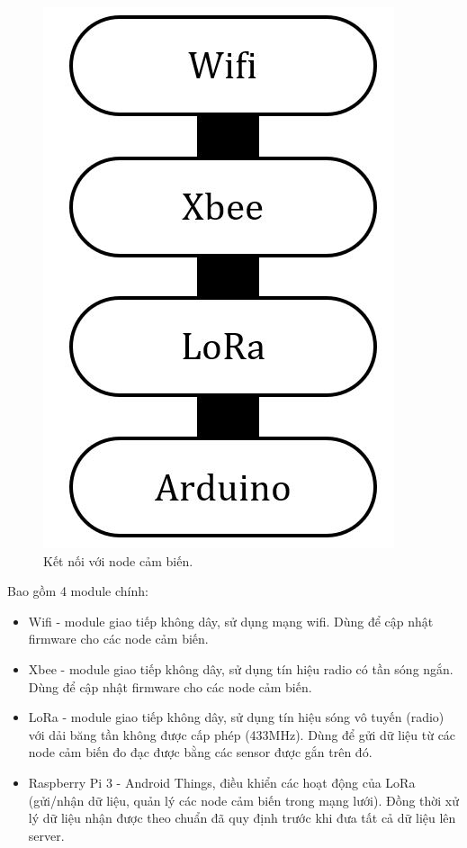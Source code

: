 \begin{center}
    \begin{figure}[htp]
    \begin{center}
     \includegraphics[scale=0.4]{image2/node.JPG}
    \end{center}
    \caption{Kết nối với node cảm biến.}
    \end{figure}
\end{center}

Bao gồm 4 module chính:
\begin{itemize}
    \item Wifi - module giao tiếp không dây, sử dụng mạng wifi. Dùng để cập nhật firmware cho các node cảm biến.
    \item Xbee - module giao tiếp không dây, sử dụng tín hiệu radio có tần sóng ngắn. Dùng để cập nhật firmware cho các node cảm biến.
    \item LoRa - module giao tiếp không dây, sử dụng tín hiệu sóng vô tuyến (radio) với dải băng tần không được cấp phép (433MHz). Dùng để gửi dữ liệu từ các node cảm biến đo đạc được bằng các sensor được gắn trên đó.
    \item Raspberry Pi 3 - Android Things, điều khiển các hoạt động của LoRa (gửi/nhận dữ liệu, quản lý các node cảm biến trong mạng lưới). Đồng thời xử lý dữ liệu nhận được theo chuẩn đã quy định trước khi đưa tất cả dữ liệu lên server.
\end{itemize}


